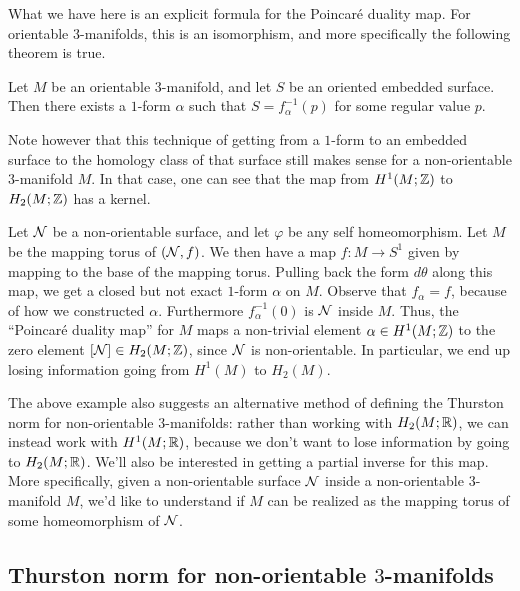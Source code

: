 What we have here is an explicit formula for the Poincar\'e duality map. For orientable $3$-manifolds, this
is an isomorphism, and more specifically the following theorem is true.
\begin{thm}
  Let $M$ be an orientable $3$-manifold, and let $S$ be an oriented embedded surface. Then there exists a $1$-form
  $\alpha$ such that $S = f_{\alpha}^{-1}(p)$ for some regular value $p$.
\end{thm}

Note however that this technique of getting from a $1$-form to an embedded surface to the homology class of
that surface still makes sense for a non-orientable $3$-manifold $M$. In that case, one can see that the map from
$H^1(M; \mathbb{Z})$ to $H_2(M; \mathbb{Z})$ has a kernel.
\begin{example}
  Let $\mathcal{N}$ be a non-orientable surface, and let $\varphi$ be any self homeomorphism. Let $M$ be the mapping torus
  of $(\mathcal{N}, f)$. We then have a map $f: M \to S^1$ given by mapping to the base of the mapping torus.
  Pulling back the form $d\theta$ along this map, we get a closed but not exact $1$-form $\alpha$ on $M$. Observe
  that $f_{\alpha} = f$, because of how we constructed $\alpha$. Furthermore $f_{\alpha}^{-1}(0)$ is $\mathcal{N}$ inside
  $M$. Thus, the ``Poincar\'e duality map'' for $M$ maps a non-trivial element $\alpha \in H^1(M; \mathbb{Z})$ to the
  zero element $[\mathcal{N}] \in H_2(M; \mathbb{Z})$, since $\mathcal{N}$ is non-orientable. In particular, we end up losing information
  going from $H^1(M)$ to $H_2(M)$.
\end{example}

The above example also suggests an alternative method of defining the Thurston norm for non-orientable
$3$-manifolds: rather than working with $H_2(M; \mathbb{R})$, we can instead work with $H^1(M; \mathbb{R})$, because we
don't want to lose information by going to $H_2(M; \mathbb{R})$. We'll also be interested in getting a partial
inverse for this map. More specifically, given a non-orientable surface $\mathcal{N}$ inside a non-orientable
$3$-manifold $M$, we'd like to understand if $M$ can be realized as the mapping torus of some homeomorphism of
$\mathcal{N}$.

\subsection{Thurston norm for non-orientable $3$-manifolds}
\label{sec:thurston-norm-non}

